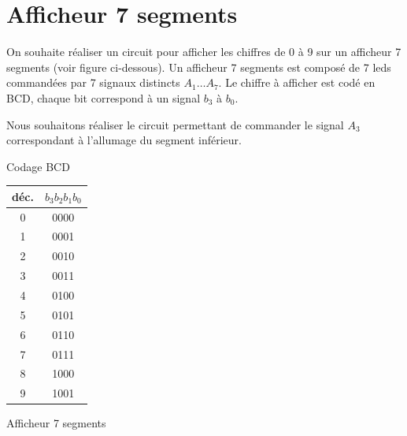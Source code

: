 \documentclass[a4paper,10pt]{exam}
\begin{document}
\section{Afficheur 7 segments}
On souhaite réaliser un circuit pour afficher les chiffres de 0 à 9 sur un
afficheur 7 segments (voir figure ci-dessous).  Un afficheur 7 segments est
composé de 7 leds commandées par 7 signaux distincts $A_1 \dots A_7$.  Le
chiffre à afficher est codé en BCD, chaque bit correspond à un signal $b_3$ à
$b_0$.

Nous souhaitons réaliser le circuit permettant de commander le signal $A_3$
correspondant à l'allumage du segment inférieur.

\vspace{1cm}
\begin{minipage}{0.4\textwidth}
\begin{center}
Codage BCD

\begin{tabular}{c|c}
  déc. & $b_3b_2b_1b_0$ \\
  \hline
  0 & 0000\\
  1 & 0001\\
  2 & 0010\\
  3 & 0011\\
  4 & 0100\\
  5 & 0101\\
  6 & 0110\\
  7 & 0111\\
  8 & 1000\\
  9 & 1001
\end{tabular}
\end{center}
\end{minipage}
\begin{minipage}{0.4\textwidth}
\begin{center}
Afficheur 7 segments

\end{center}
\end{minipage}
\end{document}
